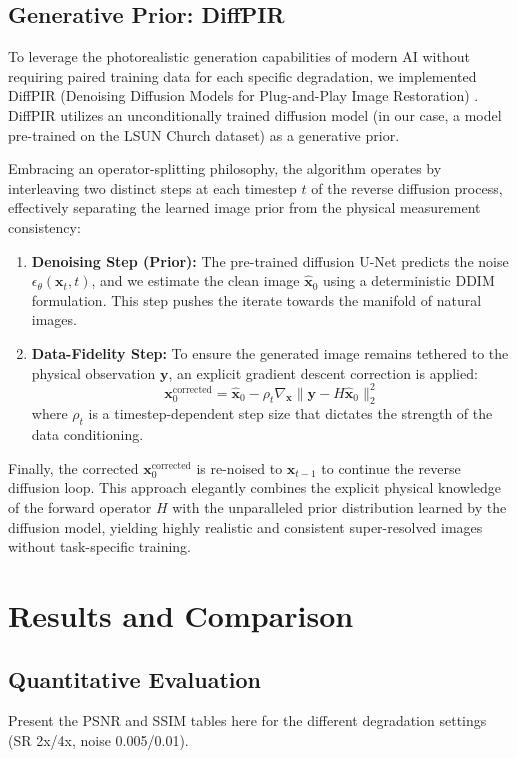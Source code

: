 \documentclass[10pt,journal,compsoc]{IEEEtran}
\begin{document}
\subsection{Generative Prior: DiffPIR}
To leverage the photorealistic generation capabilities of modern AI without requiring paired training data for each specific degradation, we implemented DiffPIR (Denoising Diffusion Models for Plug-and-Play Image Restoration) \cite{zhu2023diffpir}. DiffPIR utilizes an unconditionally trained diffusion model (in our case, a model pre-trained on the LSUN Church dataset) as a generative prior.

Embracing an operator-splitting philosophy, the algorithm operates by interleaving two distinct steps at each timestep $t$ of the reverse diffusion process, effectively separating the learned image prior from the physical measurement consistency:
\begin{enumerate}
    \item \textbf{Denoising Step (Prior):} The pre-trained diffusion U-Net predicts the noise $\epsilon_\theta(\mathbf{x}_t, t)$, and we estimate the clean image $\hat{\mathbf{x}}_0$ using a deterministic DDIM formulation. This step pushes the iterate towards the manifold of natural images.
    \item \textbf{Data-Fidelity Step:} To ensure the generated image remains tethered to the physical observation $\mathbf{y}$, an explicit gradient descent correction is applied:
    \begin{equation}
        \mathbf{x}_0^{\text{corrected}} = \hat{\mathbf{x}}_0 - \rho_t \nabla_{\mathbf{x}} \| \mathbf{y} - H\hat{\mathbf{x}}_0 \|_2^2
    \end{equation}
    where $\rho_t$ is a timestep-dependent step size that dictates the strength of the data conditioning.
\end{enumerate}
Finally, the corrected $\mathbf{x}_0^{\text{corrected}}$ is re-noised to $\mathbf{x}_{t-1}$ to continue the reverse diffusion loop. This approach elegantly combines the explicit physical knowledge of the forward operator $H$ with the unparalleled prior distribution learned by the diffusion model, yielding highly realistic and consistent super-resolved images without task-specific training.

\section{Results and Comparison}
\subsection{Quantitative Evaluation}
Present the PSNR and SSIM tables here for the different degradation settings (SR 2x/4x, noise 0.005/0.01).
\end{document}
